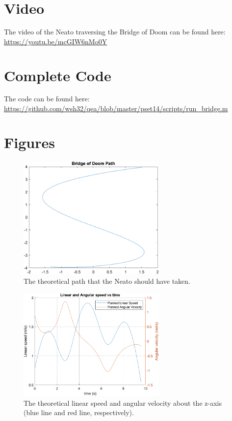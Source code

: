 \section{Video}
The video of the Neato traversing the Bridge of Doom can be found here:
\url{https://youtu.be/mcGIW6nMo0Y}

\section{Complete Code}
The code can be found here: \url{https://github.com/wsh32/qea/blob/master/pset14/scripts/run_bridge.m}

\section{Figures}

\begin{figure}[h]
    \centering
    \includegraphics[width=0.65\textwidth]{img/predicted_path.png}
    \caption{The theoretical path that the Neato should have taken.}
    \label{fig:both_paths}
\end{figure}

\begin{figure}[h]
    \centering
    \includegraphics[width=0.65\textwidth]{img/planned_speeds.png}
    \caption{The theoretical linear speed and angular velocity about the z-axis (blue line and red line, respectively).}
    \label{fig:planned_lin_ang_speeds}
\end{figure}

